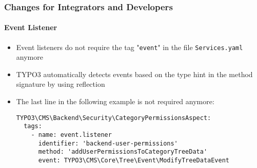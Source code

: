 %

\begin{frame}[fragile]
	\frametitle{Changes for Integrators and Developers}
	\framesubtitle{Event Listener}

	\begin{itemize}
		\item Event listeners do not require the tag "\texttt{event}"
			in the file \texttt{Services.yaml} anymore
		\item TYPO3 automatically detects events based on the type hint in the
			method signature by using reflection
		\item The last line in the following example is not required anymore:

\begin{lstlisting}
TYPO3\CMS\Backend\Security\CategoryPermissionsAspect:
  tags:
    - name: event.listener
      identifier: 'backend-user-permissions'
      method: 'addUserPermissionsToCategoryTreeData'
      event: TYPO3\CMS\Core\Tree\Event\ModifyTreeDataEvent
\end{lstlisting}

	\end{itemize}

\end{frame}

